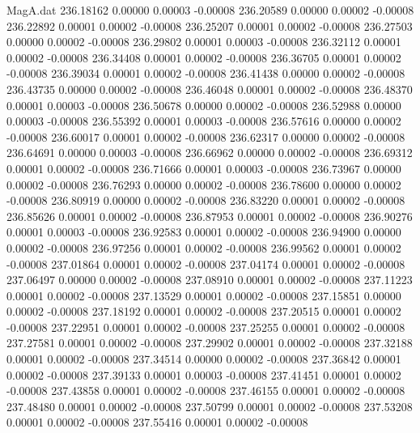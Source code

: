 \begin{filecontents}{MagA.dat}
 236.18162    0.00000    0.00003   -0.00008
 236.20589    0.00000    0.00002   -0.00008
 236.22892    0.00001    0.00002   -0.00008
 236.25207    0.00001    0.00002   -0.00008
 236.27503    0.00000    0.00002   -0.00008
 236.29802    0.00001    0.00003   -0.00008
 236.32112    0.00001    0.00002   -0.00008
 236.34408    0.00001    0.00002   -0.00008
 236.36705    0.00001    0.00002   -0.00008
 236.39034    0.00001    0.00002   -0.00008
 236.41438    0.00000    0.00002   -0.00008
 236.43735    0.00000    0.00002   -0.00008
 236.46048    0.00001    0.00002   -0.00008
 236.48370    0.00001    0.00003   -0.00008
 236.50678    0.00000    0.00002   -0.00008
 236.52988    0.00000    0.00003   -0.00008
 236.55392    0.00001    0.00003   -0.00008
 236.57616    0.00000    0.00002   -0.00008
 236.60017    0.00001    0.00002   -0.00008
 236.62317    0.00000    0.00002   -0.00008
 236.64691    0.00000    0.00003   -0.00008
 236.66962    0.00000    0.00002   -0.00008
 236.69312    0.00001    0.00002   -0.00008
 236.71666    0.00001    0.00003   -0.00008
 236.73967    0.00000    0.00002   -0.00008
 236.76293    0.00000    0.00002   -0.00008
 236.78600    0.00000    0.00002   -0.00008
 236.80919    0.00000    0.00002   -0.00008
 236.83220    0.00001    0.00002   -0.00008
 236.85626    0.00001    0.00002   -0.00008
 236.87953    0.00001    0.00002   -0.00008
 236.90276    0.00001    0.00003   -0.00008
 236.92583    0.00001    0.00002   -0.00008
 236.94900    0.00000    0.00002   -0.00008
 236.97256    0.00001    0.00002   -0.00008
 236.99562    0.00001    0.00002   -0.00008
 237.01864    0.00001    0.00002   -0.00008
 237.04174    0.00001    0.00002   -0.00008
 237.06497    0.00000    0.00002   -0.00008
 237.08910    0.00001    0.00002   -0.00008
 237.11223    0.00001    0.00002   -0.00008
 237.13529    0.00001    0.00002   -0.00008
 237.15851    0.00000    0.00002   -0.00008
 237.18192    0.00001    0.00002   -0.00008
 237.20515    0.00001    0.00002   -0.00008
 237.22951    0.00001    0.00002   -0.00008
 237.25255    0.00001    0.00002   -0.00008
 237.27581    0.00001    0.00002   -0.00008
 237.29902    0.00001    0.00002   -0.00008
 237.32188    0.00001    0.00002   -0.00008
 237.34514    0.00000    0.00002   -0.00008
 237.36842    0.00001    0.00002   -0.00008
 237.39133    0.00001    0.00003   -0.00008
 237.41451    0.00001    0.00002   -0.00008
 237.43858    0.00001    0.00002   -0.00008
 237.46155    0.00001    0.00002   -0.00008
 237.48480    0.00001    0.00002   -0.00008
 237.50799    0.00001    0.00002   -0.00008
 237.53208    0.00001    0.00002   -0.00008
 237.55416    0.00001    0.00002   -0.00008

\end{filecontents}
